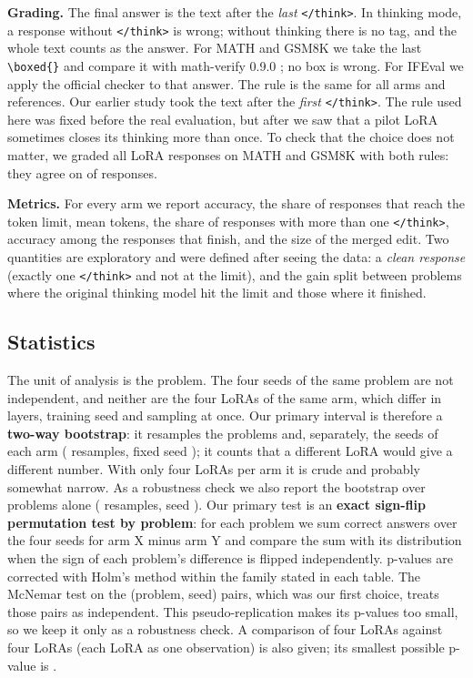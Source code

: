 \documentclass[11pt]{article}
\begin{document}
\textbf{Grading.} The final answer is the text after the \emph{last} \texttt{</think>}. In thinking mode, a response without \texttt{</think>} is wrong; without thinking there is no tag, and the whole text counts as the answer. For MATH and GSM8K we take the last \texttt{\textbackslash{}boxed\{\}} and compare it with math-verify 0.9.0 \citep{mathverify}; no box is wrong. For IFEval we apply the official checker to that answer. The rule is the same for all arms and references. Our earlier study took the text after the \emph{first} \texttt{</think>}. The rule used here was fixed before the real evaluation, but after we saw that a pilot LoRA sometimes closes its thinking more than once. To check that the choice does not matter, we graded all LoRA responses on MATH and GSM8K with both rules: they agree on \RuleSame{} of \RuleItems{} responses.

\textbf{Metrics.} For every arm we report accuracy, the share of responses that reach the token limit, mean tokens, the share of responses with more than one \texttt{</think>}, accuracy among the responses that finish, and the size of the merged edit. Two quantities are exploratory and were defined after seeing the data: a \emph{clean response} (exactly one \texttt{</think>} and not at the limit), and the gain split between problems where the original thinking model hit the limit and those where it finished.

\subsection{Statistics}\label{sec:3.6}

The unit of analysis is the problem. The four seeds of the same problem are not independent, and neither are the four LoRAs of the same arm, which differ in layers, training seed and sampling at once. Our primary interval is therefore a \textbf{two-way bootstrap}: it resamples the problems and, separately, the seeds of each arm (\BootTwoWayReps{} resamples, fixed seed \BootTwoWaySeed{}); it counts that a different LoRA would give a different number. With only four LoRAs per arm it is crude and probably somewhat narrow. As a robustness check we also report the bootstrap over problems alone (\BootProblemReps{} resamples, seed \BootProblemSeed{}). Our primary test is an \textbf{exact sign-flip permutation test by problem}: for each problem we sum correct answers over the four seeds for arm X minus arm Y and compare the sum with its distribution when the sign of each problem's difference is flipped independently. p-values are corrected with Holm's method within the family stated in each table. The McNemar test on the \NPairs{} (problem, seed) pairs, which was our first choice, treats those pairs as independent. This pseudo-replication makes its p-values too small, so we keep it only as a robustness check. A comparison of four LoRAs against four LoRAs (each LoRA as one observation) is also given; its smallest possible p-value is \LoraMinP{}.
\end{document}
